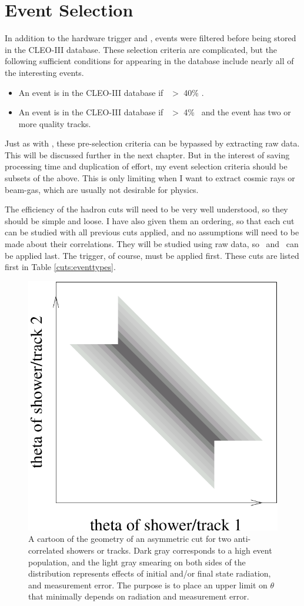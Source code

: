 \section{Event Selection}

In addition to the hardware trigger and \lfourdec, events were
filtered before being stored in the CLEO-III database.  These
selection criteria are complicated, but the following sufficient
conditions for appearing in the database include nearly all of the
interesting events.
\begin{itemize}
  \item An event is in the CLEO-III database if \hotvisen\ $>$ 40\%
    \ecom.

  \item \label{wonderfuldiscovery} An event is in the CLEO-III
    database if \hotvisen\ $>$ 4\% \ecom\ and the event has two or
    more quality tracks.
\end{itemize}

Just as with \lfourdec, these pre-selection criteria can be bypassed
by extracting raw data.  This will be discussed further in the next
chapter.  But in the interest of saving processing time and
duplication of effort, my event selection criteria should be subsets
of the above.  This is only limiting when I want to extract cosmic
rays or beam-gas, which are usually not desirable for physics.

The efficiency of the hadron cuts will need to be very well
understood, so they should be simple and loose.  I have also given
them an ordering, so that each cut can be studied with all previous
cuts applied, and no assumptions will need to be made about their
correlations.  They will be studied using raw data, so \visen\ and
\lfourdec\ can be applied last.  The trigger, of course, must be
applied first.  These cuts are listed first in Table
\ref{cuts:eventtypes}.

\begin{figure}[t]
  \begin{center}
    \includegraphics[width=0.4\linewidth]{plots/explain_asymmetric_cut}
  \end{center}
  \caption{\label{cuts:explain_asymmetric_cut} A cartoon of the
    geometry of an asymmetric cut for two anti-correlated showers or
    tracks.  Dark gray corresponds to a high event population, and the
    light gray smearing on both sides of the distribution represents
    effects of initial and/or final state radiation, and measurement
    error.  The purpose is to place an upper limit on $\theta$ that
    minimally depends on radiation and measurement error.}
\end{figure}

